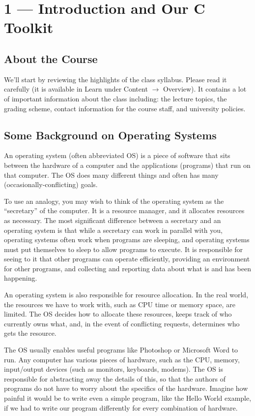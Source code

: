 \documentclass[a4paper]{report}
\begin{document}
\tableofcontents


\chapter*{1 --- Introduction and Our C Toolkit}


\section*{About the Course}
We'll start by reviewing the highlights of the class syllabus. Please read it carefully (it is available in Learn under Content $\rightarrow$ Overview). It contains a lot of important information about the class including: the lecture topics, the grading scheme, contact information for the course staff, and university policies.

\section*{Some Background on Operating Systems}

An operating system (often abbreviated OS) is a piece of software that sits between the hardware of a computer and the applications (programs) that run on that computer. The OS does many different things and often has many (occasionally-conflicting) goals.

To use an analogy, you may wish to think of the operating system as the ``secretary'' of the computer.  It is a resource manager, and it allocates resources as necessary.  The most significant difference between a secretary and an operating system is that while a secretary can work in parallel with you, operating systems often work when programs are sleeping, and operating systems must put themselves to sleep to allow programs to execute. It is responsible for seeing to it that other programs can operate efficiently, providing an environment for other programs, and collecting and reporting data about what is and has been happening.

An operating system is also responsible for resource allocation. In the real world, the resources we have to work with, such as CPU time or memory space, are limited. The OS decides how to allocate these resources, keeps track of who currently owns what, and, in the event of conflicting requests, determines who gets the resource.

The OS usually enables useful programs like Photoshop or Microsoft Word to run. Any computer has various pieces of hardware, such as the CPU, memory, input/output devices (such as monitors, keyboards, modems). The OS is responsible for abstracting away the details of this, so that the authors of programs do not have to worry about the specifics of the hardware. Imagine how painful it would be to write even a simple program, like the Hello World example, if we had to write our program differently for every combination of hardware.
\end{document}
